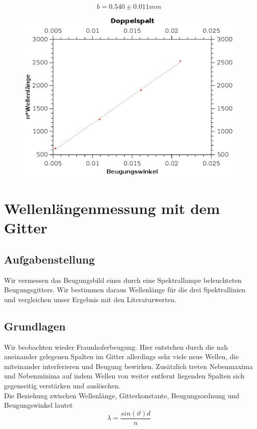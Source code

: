 \documentclass{article}
\begin{document}
$$\boxed{b=0.540 \pm 0.011 mm}$$
\begin{center}
\begin{figure}[H]
\includegraphics[scale=0.7]{doppelspalt.eps} 
\end{figure}
\end{center}
\section{Wellenlängenmessung mit dem Gitter}

\subsection{Aufgabenstellung}
Wir vermessen das Beugungsbild eines durch eine Spektrallampe beleuchteten Beugungsgitters. Wir bestimmen daraus Wellenlänge für die drei Spektrallinien und vergleichen unser Ergebnis mit den Literaturwerten.
\subsection{Grundlagen}
Wir beobachten wieder Fraunhoferbeugung. Hier entstehen durch die nah aneinander gelegenen Spalten im Gitter allerdings sehr viele neue Wellen, die miteinander interferieren und Beugung bewirken. Zusätzlich treten Nebenmaxima und Nebenminima auf indem Wellen von weiter entfernt liegenden Spalten sich gegenseitig verstärken und auslöschen. \\
Die Beziehung zwischen Wellenlänge, Gitterkonstante, Beugungsordnung und Beugungswinkel lautet \\
\begin{equation}
\label{gitter}
\lambda=\frac{sin(\vartheta)d}{n}
\end{equation}
\end{document}
